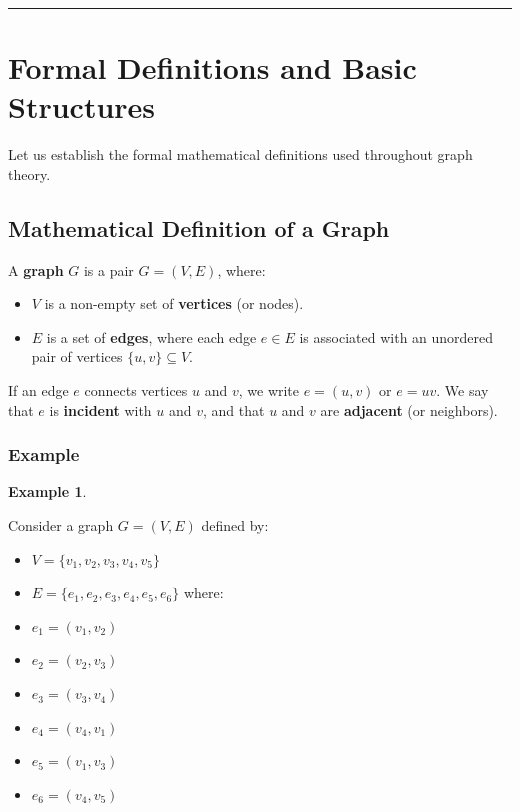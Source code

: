 \documentclass[
]{book}
\providecommand{\tightlist}{%
  \setlength{\itemsep}{0pt}\setlength{\parskip}{0pt}}
\theoremstyle{definition}
\theoremstyle{definition}
\newtheorem{example}{Example}[chapter]
\theoremstyle{definition}
\theoremstyle{definition}
\theoremstyle{remark}
\begin{document}
\begin{center}\rule{0.5\linewidth}{0.5pt}\end{center}

\section{Formal Definitions and Basic Structures}\label{formal-definitions-and-basic-structures}

Let us establish the formal mathematical definitions used throughout graph theory.

\subsection{Mathematical Definition of a Graph}\label{mathematical-definition-of-a-graph}

A \textbf{graph} \(G\) is a pair \(G = (V, E)\), where:

\begin{itemize}
\tightlist
\item
  \(V\) is a non-empty set of \textbf{vertices} (or nodes).
\item
  \(E\) is a set of \textbf{edges}, where each edge \(e \in E\) is associated with an unordered pair of vertices \(\{u, v\} \subseteq V\).
\end{itemize}

If an edge \(e\) connects vertices \(u\) and \(v\), we write \(e = (u, v)\) or \(e = uv\). We say that \(e\) is \textbf{incident} with \(u\) and \(v\), and that \(u\) and \(v\) are \textbf{adjacent} (or neighbors).

\subsubsection{Example}\label{example}

\begin{example}
\protect\hypertarget{exm:unnamed-chunk-1}{}\label{exm:unnamed-chunk-1}

Consider a graph \(G = (V, E)\) defined by:

\begin{itemize}
\tightlist
\item
  \(V = \{v_1, v_2, v_3, v_4, v_5\}\)
\item
  \(E = \{e_1, e_2, e_3, e_4, e_5, e_6\}\) where:
\item
  \(e_1 = (v_1, v_2)\)
\item
  \(e_2 = (v_2, v_3)\)
\item
  \(e_3 = (v_3, v_4)\)
\item
  \(e_4 = (v_4, v_1)\)
\item
  \(e_5 = (v_1, v_3)\)
\item
  \(e_6 = (v_4, v_5)\)
\end{itemize}

\end{example}
\end{document}
